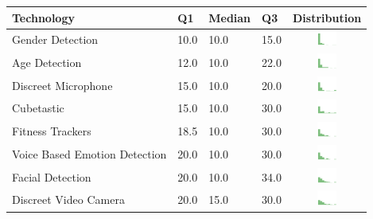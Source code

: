 \begin{table}[h!!!!!]
\begin{center}
\small
\begin{tabular}{| p{2cm} | p{1cm} | p{1cm} | p{1cm} | c |}
\hline
Technology & Q1 &  Median & Q3 & Distribution  \\ 
\hline
Gender Detection & 10.0 & 10.0 & 15.0 & \includegraphics[width = 2cm, height = 0.5cm]{tex-inputs/table-images/genderdetectionben} \\ 
Age Detection & 12.0 & 10.0 & 22.0 & \includegraphics[width = 2cm, height = 0.5cm]{tex-inputs/table-images/agedetectionben} \\ 
Discreet Microphone & 15.0 & 10.0 & 20.0 & \includegraphics[width = 2cm, height = 0.5cm]{tex-inputs/table-images/discreetmicrophoneben} \\ 
Cubetastic & 15.0 & 10.0 & 30.0 & \includegraphics[width = 2cm, height = 0.5cm]{tex-inputs/table-images/cubetasticben} \\ 
Fitness Trackers & 18.5 & 10.0 & 30.0 & \includegraphics[width = 2cm, height = 0.5cm]{tex-inputs/table-images/fitnesstrackersben} \\ 
Voice Based Emotion Detection & 20.0 & 10.0 & 30.0 & \includegraphics[width = 2cm, height = 0.5cm]{tex-inputs/table-images/voicebasedemotiondetectionben} \\ 
Facial Detection & 20.0 & 10.0 & 34.0 & \includegraphics[width = 2cm, height = 0.5cm]{tex-inputs/table-images/facialdetectionben} \\ 
Discreet Video Camera & 20.0 & 15.0 & 30.0 & \includegraphics[width = 2cm, height = 0.5cm]{tex-inputs/table-images/discreetvideocameraben} \\ 

\end{tabular}
\end{center}
\end{table}
